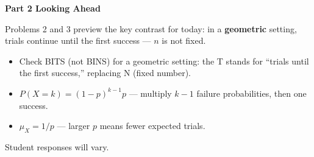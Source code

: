 \documentclass[10pt]{article}
\begin{document}
\vspace{0.2in}

{\large\bfseries\color{navy} Part 2 \quad Looking Ahead}

\vspace{0.12in}

\noindent Problems 2 and 3 preview the key contrast for today: in a \textbf{geometric}
setting, trials continue until the first success --- $n$ is not fixed.

\vspace{0.14in}

\begin{tcolorbox}[colback=greenbg, colframe=greenacc, boxrule=0.8pt, arc=2mm,
    left=4mm, right=4mm, top=3mm, bottom=3mm]
    \small
    \begin{itemize}[leftmargin=1.3em, itemsep=8pt]
  \item Check BITS (not BINS) for a geometric setting: the T stands for
        ``trials until the first success,'' replacing N (fixed number).
  \item $P(X = k) = (1-p)^{k-1}p$ --- multiply $k-1$ failure probabilities,
        then one success.
  \item $\mu_X = 1/p$ --- larger $p$ means fewer expected trials.
    \end{itemize}
\end{tcolorbox}

\vspace{0.18in}

\noindent\textcolor{slate}{\small Student responses will vary.}
\end{document}
